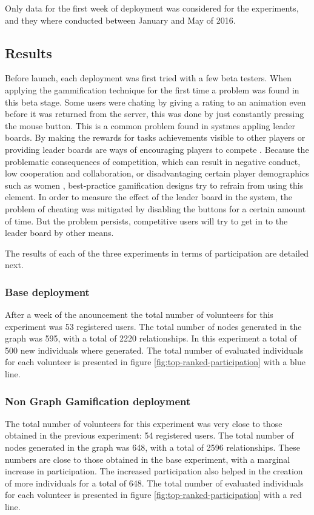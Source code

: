 \documentclass[conference]{IEEEtran}
\begin{document}
Only data for the first week of deployment was considered for the experiments, and they where conducted 
between January and May of 2016. 

\subsection{Results}
\label{sec:results}

Before launch, each deployment was first tried with a few beta testers. When applying the gammification
technique for the first time a problem was found in this beta stage. Some users were chating by 
giving a rating to an animation even before it was returned from the server, this was done by just
constantly pressing the mouse button. This is a common problem found in systmes appling leader boards.
By making the rewards for tasks achievements visible to other players or providing leader boards are ways of 
encouraging players to compete \cite{hickman2010total}. Because the  problematic consequences of competition, 
which can result in negative conduct, low cooperation and collaboration, or disadvantaging certain player
demographics such as women \cite{kumar2013gamification}, best-practice gamification designs try to
refrain from using this element. In order to measure the effect of the leader board in the system, the 
problem of cheating was mitigated by disabling the buttons for a certain amount of time. But the problem 
persists, competitive users will try to get in to the leader board by other means. 
% 
%

The results of each of the three experiments in terms of participation are detailed next.

\subsubsection{ Base deployment}
After a week of the anouncement the total number of volunteers for this experiment was 53 registered users. 
The total number of nodes generated in the graph was 595, with a total of 2220 relationships. In this
experiment a total of 500 new individuals where generated. The total number of evaluated
individuals for each volunteer is presented in figure \ref{fig:top-ranked-participation} with a blue line. 


\subsubsection{ Non Graph Gamification deployment}
The total number of volunteers for this experiment was very close to those obtained in the previous
experiment: 54 registered users. The total number of nodes generated in the graph was 648, 
with a total of 2596 relationships. These numbers are close to those obtained in the base experiment,
with a marginal increase in participation. The increased participation also helped in the creation of
more individuals for a total of 648. The total number of evaluated
individuals for each volunteer is presented in figure \ref{fig:top-ranked-participation} with a red line. 
\end{document}
